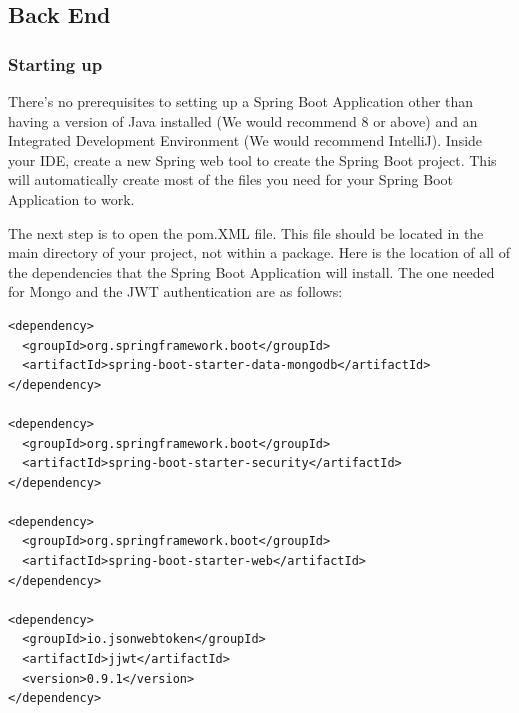 \subsection{Back End}
\subsubsection{Starting up}
There's no prerequisites to setting up a Spring Boot Application other than having a version of Java installed (We would recommend 8 or above) and an Integrated Development Environment (We would recommend IntelliJ). Inside your IDE, create a new Spring web tool to create the Spring Boot project. This will automatically create most of the files you need for your Spring Boot Application to work. \par
The next step is to open the pom.XML file. This file should be located in the main directory of your project, not within a package. Here is the location of all of the dependencies that the Spring Boot Application will install. The one needed for Mongo and the JWT authentication are as follows: \par
\begin{verbatim}
<dependency>
  <groupId>org.springframework.boot</groupId>
  <artifactId>spring-boot-starter-data-mongodb</artifactId>
</dependency>

<dependency>
  <groupId>org.springframework.boot</groupId>
  <artifactId>spring-boot-starter-security</artifactId>
</dependency>

<dependency>
  <groupId>org.springframework.boot</groupId>
  <artifactId>spring-boot-starter-web</artifactId>
</dependency>

<dependency>
  <groupId>io.jsonwebtoken</groupId>
  <artifactId>jjwt</artifactId>
  <version>0.9.1</version>
</dependency>
\end{verbatim}

